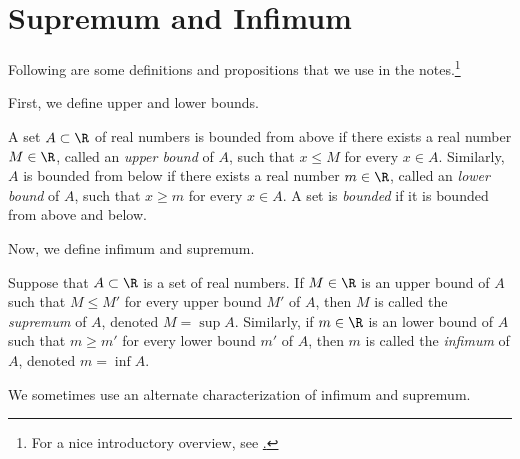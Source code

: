 \documentclass{article} %
\begin{document}




\appendix

\section{Supremum and Infimum}

Following are some definitions and propositions that we use in the notes.\footnote{For a nice introductory overview, see \href{https://www.math.ucdavis.edu/~hunter/m125b/ch2.pdf}.}

First, we define upper and lower bounds.
\begin{definition}
A set $A \subset \R$ of real numbers is bounded from above if there exists a real number $M \in \R$, called an \textit{upper bound} of $A$, such that $x \leq M$ for every $x \in A$.  Similarly, $A$  is bounded from below if there exists a real number $m \in \R$, called an \textit{lower bound} of $A$, such that $x \geq m$ for every $x \in A$.  A set is \textit{bounded} if it is bounded from above and below.
\label{def:upper_and_lower_bound}	
\end{definition}


Now, we define infimum and supremum.
\begin{definition}
Suppose that $A \subset \R$ is a set of real numbers. If $M \in \R$ is an upper bound of $A$ such that $M \leq M'$ for every upper bound $M'$ of $A$, then $M$ is called the \textit{supremum} of $A$, denoted $M=\sup A$.   Similarly, if $m \in \R$ is an lower bound of $A$ such that $m \geq m'$ for every lower bound $m'$ of $A$, then $m$ is called the \textit{infimum} of $A$, denoted $m=\inf A$.\label{def:supremum_and_infimum}	
\end{definition}

We sometimes use an alternate characterization of infimum and supremum.
\end{document}
